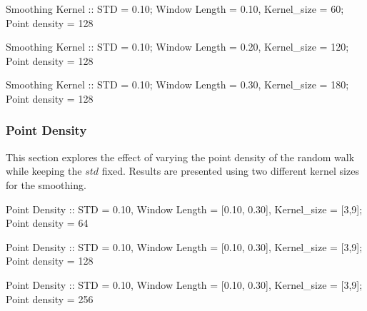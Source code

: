 \documentclass[AMA,LATO1COL]{WileyNJD-v2}
\begin{document}
\begin{center}
Smoothing Kernel :: STD = 0.10; Window Length = 0.10, Kernel\_size = 60; Point density = 128


    \begin{center}
    \end{center}

    
    \newpage 
Smoothing Kernel :: STD = 0.10; Window Length = 0.20, Kernel\_size = 120; Point density = 128


    \begin{center}
    \end{center}

    
    \newpage 
Smoothing Kernel :: STD = 0.10; Window Length = 0.30, Kernel\_size = 180; Point density = 128


    \begin{center}
    \end{center}

\end{center}
    
\newpage
\subsubsection{Point Density}\label{baseline:point-density}
This section explores the effect of varying the point density of the random walk while keeping the \(std\) fixed. Results are presented using two different kernel sizes for the smoothing.

\begin{center}
Point Density :: STD = 0.10, Window Length = [0.10, 0.30], Kernel\_size = [3,9]; Point density = 64


    \begin{center}
    \end{center}

    
    \newpage 
Point Density :: STD = 0.10, Window Length = [0.10, 0.30], Kernel\_size = [3,9]; Point density = 128


    \begin{center}
    \end{center}

    
    \newpage 
Point Density :: STD = 0.10, Window Length = [0.10, 0.30], Kernel\_size = [3,9]; Point density = 256


    \begin{center}
    \end{center}

\end{center}
    
\end{document}
